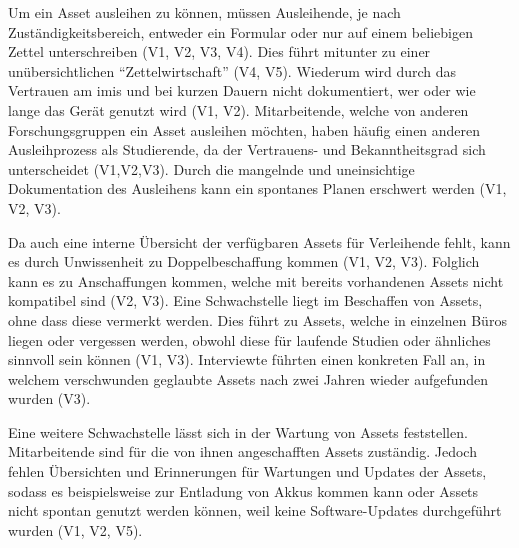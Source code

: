 Um ein Asset ausleihen zu können, müssen Ausleihende, je nach Zuständigkeitsbereich, entweder ein
Formular oder nur auf einem beliebigen Zettel unterschreiben (V1, V2, V3, V4). Dies führt mitunter
zu einer unübersichtlichen \enquote{Zettelwirtschaft} (V4, V5). Wiederum wird durch das Vertrauen am
\ac{imis} und bei kurzen Dauern nicht dokumentiert, wer oder wie lange das Gerät genutzt wird (V1,
V2). Mitarbeitende, welche von anderen Forschungsgruppen ein Asset ausleihen möchten, haben häufig
einen anderen Ausleihprozess als Studierende, da der Vertrauens- und Bekanntheitsgrad sich
unterscheidet (V1,V2,V3). Durch die mangelnde und uneinsichtige Dokumentation des Ausleihens kann
ein spontanes Planen erschwert werden (V1, V2, V3).

Da auch eine interne Übersicht der verfügbaren Assets für Verleihende fehlt, kann es durch
Unwissenheit zu Doppelbeschaffung kommen (V1, V2, V3). Folglich kann es zu Anschaffungen kommen,
welche mit bereits vorhandenen Assets nicht kompatibel sind (V2, V3). Eine Schwachstelle liegt im
Beschaffen von Assets, ohne dass diese vermerkt werden. Dies führt zu Assets, welche in einzelnen
Büros liegen oder vergessen werden, obwohl diese für laufende Studien oder ähnliches sinnvoll sein
können (V1, V3). Interviewte führten einen konkreten Fall an, in welchem verschwunden geglaubte
Assets nach zwei Jahren wieder aufgefunden wurden (V3).

Eine weitere Schwachstelle lässt sich in der Wartung von Assets feststellen. Mitarbeitende sind für
die von ihnen angeschafften Assets zuständig. Jedoch fehlen Übersichten und Erinnerungen für
Wartungen und Updates der Assets, sodass es beispielsweise zur Entladung von Akkus kommen kann oder
Assets nicht spontan genutzt werden können, weil keine Software-Updates durchgeführt wurden (V1, V2,
V5).

